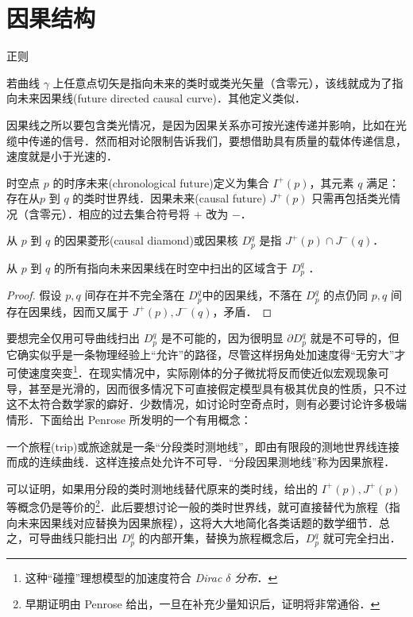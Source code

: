 \chapter{因果结构}\label{chpt:causal}


正则

\begin{definition}[因果线]
     若曲线 $\gamma$ 上任意点切矢是指向未来的类时或类光矢量（含零元），该线就成为了指向未来因果线(future directed causal curve)．其他定义类似．
\end{definition}
因果线之所以要包含类光情况，是因为因果关系亦可按光速传递并影响，比如在光缆中传递的信号．然而相对论限制告诉我们，要想借助具有质量的载体传递信息，速度就是小于光速的．
\begin{definition}[未来]
    时空点 $p$ 的时序未来(chronological future)定义为集合 $I^+(p)$，其元素 $q$ 满足：存在从$p$ 到 $q$ 的类时世界线．因果未来(causal future) $J^+(p)$ 只需再包括类光情况（含零元）．相应的过去集合符号将 $+$ 改为 $-$．
\end{definition}
\begin{definition}[因果菱形]
    从 $p$ 到 $q$ 的因果菱形(causal diamond)或因果核 $D_p^q$ 是指 $J^+(p)\cap J^-(q)$．
\end{definition}

\begin{theorem}
    从 $p$ 到 $q$ 的所有指向未来因果线在时空中扫出的区域含于 $D_p^q$ ．
\end{theorem}
\begin{proof}
    假设 $p,q$ 间存在并不完全落在 $D_p^q$中的因果线，不落在 $D_p^q$ 的点仍同 $p,q$ 间存在因果线，因而又属于 $J^+(p),J^-(q)$，矛盾．
\end{proof}
要想完全仅用可导曲线扫出 $D_p^q$ 是不可能的，因为很明显 $\partial D_p^q$ 就是不可导的，但它确实似乎是一条物理经验上“允许”的路径，尽管这样拐角处加速度得“无穷大”才可使速度突变\footnote{这种“碰撞”理想模型的加速度符合 \textit{Dirac $\delta$ 分布}．}．在现实情况中，实际刚体的分子微扰将反而使近似宏观现象可导，甚至是光滑的，因而很多情况下可直接假定模型具有极其优良的性质，只不过这不太符合数学家的癖好．少数情况，如讨论时空奇点时，则有必要讨论许多极端情形．下面给出 Penrose 所发明的一个有用概念：
\begin{definition}[旅程]
    一个旅程(trip)或旅途就是一条“分段类时测地线”，即由有限段的测地世界线连接而成的连续曲线．这样连接点处允许不可导．“分段因果测地线”称为因果旅程．
\end{definition}
可以证明，如果用分段的类时测地线替代原来的类时线，给出的 $I^+(p),J^+(p)$ 等概念仍是等价的\footnote{早期证明由 Penrose 给出，一旦在补充少量知识后，证明将非常通俗．}．此后要想讨论一般的类时世界线，就可直接替代为旅程（指向未来因果线对应替换为因果旅程），这将大大地简化各类话题的数学细节．总之，可导曲线只能扫出 $D_p^q$ 的内部开集，替换为旅程概念后，$D_p^q$ 就可完全扫出．

